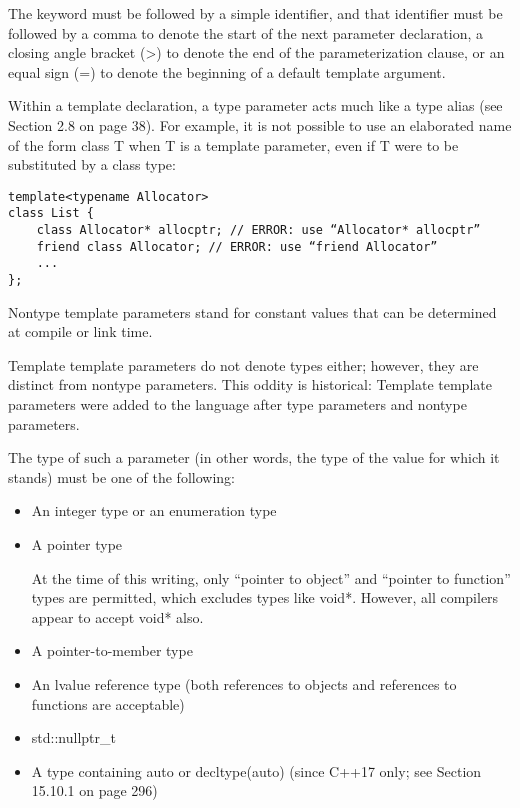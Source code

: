 The keyword must be followed by a simple identifier, and that identifier must be followed by a comma to denote the start of the next parameter declaration, a closing angle bracket (>) to denote the end of the parameterization clause, or an equal sign (=) to denote the beginning of a default template argument.

Within a template declaration, a type parameter acts much like a type alias (see Section 2.8 on page 38). For example, it is not possible to use an elaborated name of the form class T when T is a template parameter, even if T were to be substituted by a class type:

\begin{lstlisting}[style=styleCXX]
template<typename Allocator>
class List {
	class Allocator* allocptr; // ERROR: use “Allocator* allocptr”
	friend class Allocator; // ERROR: use “friend Allocator”
	...
};
\end{lstlisting}


Nontype template parameters stand for constant values that can be determined at compile or link time.

\begin{tcolorbox}[colback=webgreen!5!white,colframe=webgreen!75!black]
\hspace*{0.75cm}Template template parameters do not denote types either; however, they are distinct from nontype parameters. This oddity is historical: Template template parameters were added to the language after type parameters and nontype parameters.
\end{tcolorbox}

The type of such a parameter (in other words, the type of the value for which it stands) must be one of the following:

\begin{itemize}
\item 
An integer type or an enumeration type

\item 
A pointer type

\begin{tcolorbox}[colback=webgreen!5!white,colframe=webgreen!75!black]
\hspace*{0.75cm}At the time of this writing, only “pointer to object” and “pointer to function” types are permitted, which excludes types like void*. However, all compilers appear to accept void* also.
\end{tcolorbox}

\item 
A pointer-to-member type

\item
An lvalue reference type (both references to objects and references to functions are acceptable)

\item 
std::nullptr\_t

\item 
A type containing auto or decltype(auto) (since C++17 only; see Section 15.10.1 on page 296)
\end{itemize}

